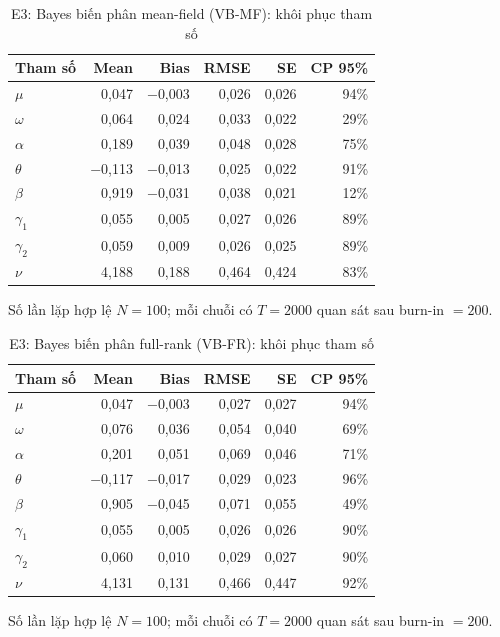 \documentclass[11pt,a4paper]{article}
\begin{document}
\begin{table}[H]\centering\footnotesize
\caption{E3: Bayes biến phân mean-field (VB-MF): khôi phục tham số}\label{tab:E3-vb_mean_field}
\begin{tabular}{l r r r r r}
\toprule
\textbf{Tham số} & \textbf{Mean} & \textbf{Bias} & \textbf{RMSE} & \textbf{SE} & \textbf{CP 95\%} \\
\midrule
$\mu$ & 0,047 & $-$0,003 & 0,026 & 0,026 & 94\% \\
$\omega$ & 0,064 & 0,024 & 0,033 & 0,022 & 29\% \\
$\alpha$ & 0,189 & 0,039 & 0,048 & 0,028 & 75\% \\
$\theta$ & $-$0,113 & $-$0,013 & 0,025 & 0,022 & 91\% \\
$\beta$ & 0,919 & $-$0,031 & 0,038 & 0,021 & 12\% \\
$\gamma_1$ & 0,055 & 0,005 & 0,027 & 0,026 & 89\% \\
$\gamma_2$ & 0,059 & 0,009 & 0,026 & 0,025 & 89\% \\
$\nu$ & 4,188 & 0,188 & 0,464 & 0,424 & 83\% \\
\bottomrule
\end{tabular}
\par\vspace{0.25em}\begin{minipage}{0.95\textwidth}\scriptsize Số lần lặp hợp lệ $N=100$; mỗi chuỗi có $T=2000$ quan sát sau burn-in $=200$. \end{minipage}
\end{table}

\begin{table}[H]\centering\footnotesize
\caption{E3: Bayes biến phân full-rank (VB-FR): khôi phục tham số}\label{tab:E3-vb_full_rank}
\begin{tabular}{l r r r r r}
\toprule
\textbf{Tham số} & \textbf{Mean} & \textbf{Bias} & \textbf{RMSE} & \textbf{SE} & \textbf{CP 95\%} \\
\midrule
$\mu$ & 0,047 & $-$0,003 & 0,027 & 0,027 & 94\% \\
$\omega$ & 0,076 & 0,036 & 0,054 & 0,040 & 69\% \\
$\alpha$ & 0,201 & 0,051 & 0,069 & 0,046 & 71\% \\
$\theta$ & $-$0,117 & $-$0,017 & 0,029 & 0,023 & 96\% \\
$\beta$ & 0,905 & $-$0,045 & 0,071 & 0,055 & 49\% \\
$\gamma_1$ & 0,055 & 0,005 & 0,026 & 0,026 & 90\% \\
$\gamma_2$ & 0,060 & 0,010 & 0,029 & 0,027 & 90\% \\
$\nu$ & 4,131 & 0,131 & 0,466 & 0,447 & 92\% \\
\bottomrule
\end{tabular}
\par\vspace{0.25em}\begin{minipage}{0.95\textwidth}\scriptsize Số lần lặp hợp lệ $N=100$; mỗi chuỗi có $T=2000$ quan sát sau burn-in $=200$. \end{minipage}
\end{table}
\end{document}
